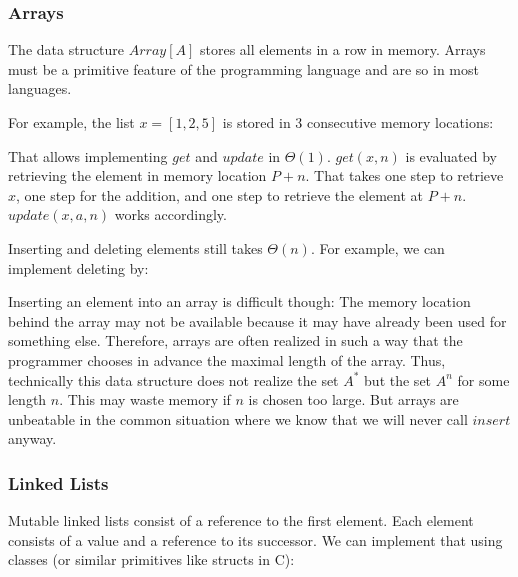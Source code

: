\subsubsection{Arrays}

The data structure $Array[A]$ stores all elements in a row in memory.
Arrays must be a primitive feature of the programming language and are so in most languages.

For example, the list $x=[1,2,5]$ is stored in $3$ consecutive memory locations:
\begin{amemory}
\alocations
{}
\end{amemory}

That allows implementing $get$ and $update$ in $\Theta(1)$.
$get(x,n)$ is evaluated by retrieving the element in memory location $P+n$.
That takes one step to retrieve $x$, one step for the addition, and one step to retrieve the element at $P+n$.
$update(x,a,n)$ works accordingly.

Inserting and deleting elements still takes $\Theta(n)$.
For example, we can implement deleting by:
\begin{acode}
\end{acode}

Inserting an element into an array is difficult though: The memory location behind the array may not be available because it may have already been used for something else.
Therefore, arrays are often realized in such a way that the programmer chooses in advance the maximal length of the array.
Thus, technically this data structure does not realize the set $A^*$ but the set $A^n$ for some length $n$.
This may waste memory if $n$ is chosen too large.
But arrays are unbeatable in the common situation where we know that we will never call $insert$ anyway.

\subsubsection{Linked Lists}

Mutable linked lists consist of a reference to the first element.
Each element consists of a value and a reference to its successor.
We can implement that using classes (or similar primitives like structs in C):
\begin{acode}
\\
\end{acode}

